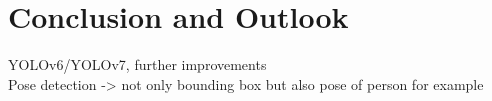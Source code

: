 
\chapter{Conclusion and Outlook}

YOLOv6/YOLOv7, further improvements \\
Pose detection -> not only bounding box but also pose of person for example
